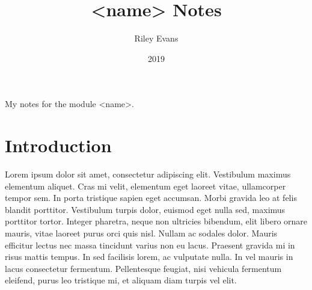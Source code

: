\documentclass{article}
\title{<name> Notes}
\author{Riley Evans}
\date{2019}
\begin{document}
\secfont
\maketitle
\normalfont
\begin{center}
My notes for the module <name>. 
\end{center}


\newpage


\tableofcontents
\newpage

\section{Introduction}
Lorem ipsum dolor sit amet, consectetur adipiscing elit. Vestibulum maximus elementum aliquet. Cras mi velit, elementum eget laoreet vitae, ullamcorper tempor sem. In porta tristique sapien eget accumsan. Morbi gravida leo at felis blandit porttitor. Vestibulum turpis dolor, euismod eget nulla sed, maximus porttitor tortor. Integer pharetra, neque non ultricies bibendum, elit libero ornare mauris, vitae laoreet purus orci quis nisl. Nullam ac sodales dolor. Mauris efficitur lectus nec massa tincidunt varius non eu lacus. Praesent gravida mi in risus mattis tempus. In sed facilisis lorem, ac vulputate nulla. In vel mauris in lacus consectetur fermentum. Pellentesque feugiat, nisi vehicula fermentum eleifend, purus leo tristique mi, et aliquam diam turpis vel elit.
\end{document}
